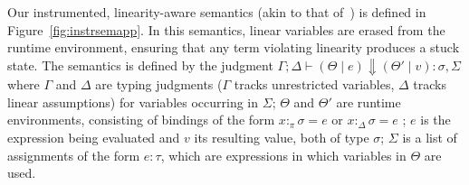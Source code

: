 \documentclass[acmsmall,review,anonymous,screen]{acmart}
\begin{document}
Our instrumented, linearity-aware semantics (akin to that
of~\cite{cite:linearhaskell})
is defined in Figure~\ref{fig:instrsemapp}.
In this semantics, linear variables are erased from
the runtime environment, ensuring that any term violating linearity
produces a stuck state. The semantics is defined by
the judgment $\Gamma ; \Delta \vdash (\Theta \mid e) \Downarrow (\Theta'
\mid v) : \sigma , \Sigma$ where $\Gamma$ and $\Delta$ are typing judgments
($\Gamma$ tracks unrestricted variables, $\Delta$ tracks linear
assumptions) for variables occurring in $\Sigma$;
$\Theta$ and $\Theta'$ are runtime environments, consisting of bindings of the form
$x :_\pi \sigma = e$ or $x :_\Delta \sigma = e$ ; $e$ is the expression being evaluated and $v$
its resulting value, both of type $\sigma$; $\Sigma$ is a list of assignments of the form
$e : \tau$, which are expressions in which variables in $\Theta$ are
used.
\end{document}
